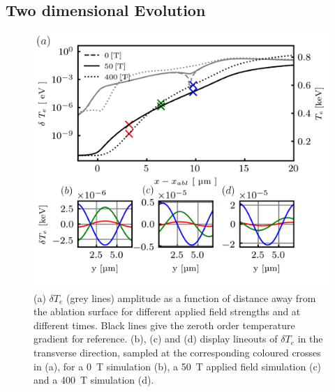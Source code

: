 \documentclass[aip,reprint]{revtex4-1}
\begin{document}
\subsection{Two dimensional Evolution}
\label{sec:2D}
\begin{figure}
		\includegraphics[width=1.0\columnwidth]{pics/plot_dT_4plots.png}
	\caption{\label{fig:dT} (a) $\delta T_e$ (grey lines) amplitude as a function of distance away from the ablation surface for different applied field strengths and at different times. Black lines give the zeroth order temperature gradient for reference. (b), (c) and (d) display lineouts of $\delta T_e$ in the transverse direction, sampled at the corresponding coloured crosses in (a), for a \SI{0}{T} simulation  (b), a \SI{50}{T} applied field simulation (c) and a \SI{400}{T} simulation (d). }%
\end{figure}
\end{document}
